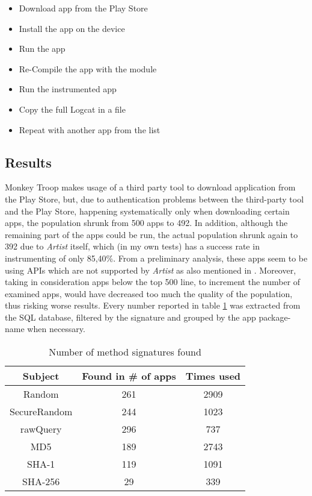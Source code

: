 \begin{itemize}
	\item{Download app from the Play Store}
	\item{Install the app on the device}
	\item{Run the app}
	\item{Re-Compile the app with the module}
	\item{Run the instrumented app}
	\item{Copy the full Logcat in a file}
	\item{Repeat with another app from the list}
\end{itemize}

\subsection{Results}
Monkey Troop makes usage of a third party tool to download application from the Play Store, but, due to authentication problems between the third-party tool and the Play Store, happening systematically only when downloading certain apps, the population shrunk from 500 apps to 492.  In addition, although the remaining part of the apps could be run, the actual population shrunk again to 392 due to \emph{Artist} itself, which (in my own tests) has a success rate in instrumenting of only 85,40\%. From a preliminary analysis, these apps seem to be using APIs which are not supported by \emph{Artist} as also mentioned in \cite{artist}. Moreover, taking in consideration apps below the top 500 line, to increment the number of examined apps, would have decreased too much the quality of the population, thus risking worse results. Every number reported in table \ref{tb:respreliminary} was extracted from the SQL database, filtered by the signature and grouped by the app package-name when necessary.

\begin{table}
	\vspace{1.5cm}
	\centering
	\begin{tabular}{|c|c|c|}
		\hline
		Subject & Found in \# of apps  & Times used \\
		\hline
		Random & 261 & 2909 \\
		\hline
		SecureRandom & 244 & 1023\\
		\hline
		rawQuery & 296 & 737\\
		\hline
		MD5 & 189 & 2743\\
		\hline
		SHA-1 & 119 & 1091\\
		\hline
		SHA-256 & 29 & 339\\
		\hline
	\end{tabular}
	\caption{Number of method signatures found}
	\label{tb:respreliminary}
	\vspace{1.5cm}
\end{table}

